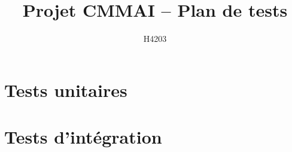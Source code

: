 \documentclass[11pt, a4paper]{article}
\title{Projet CMMAI -- Plan de tests}
\author{H4203}
\begin{document}

\part{Tests unitaires}









\newpage
\part{Tests d'intégration}
\setcounter{testno}{0}





\end{document}
